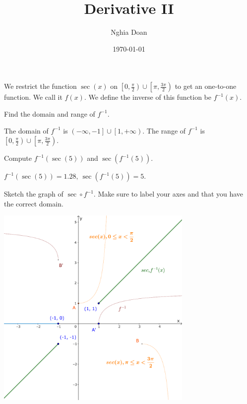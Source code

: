 \documentclass{article}
\title{Derivative II}
\author{Nghia Doan}
\date{\today}
\begin{document}
\maketitle

\begin{problem*}[1a]
    We restrict the function $\sec(x)$ on $\left[ 0, \frac{\pi}{2} \right) \cup \left[ \pi, \frac{3\pi}{2} \right)$ to get an one-to-one function.
    We call it $f(x).$ We define the inverse of this function be $f^{-1}(x).$

    Find the domain and range of $f^{-1}.$
\end{problem*}

\begin{soln}
    The domain of $f^{-1}$ is $\left( -\infty, -1 \right] \cup \left[ 1, +\infty \right).$
    The range of $f^{-1}$ is $\left[ 0, \frac{\pi}{2} \right) \cup \left[ \pi, \frac{3\pi}{2} \right).$
\end{soln}

\begin{problem*}[1b]
    Compute $f^{-1}(\sec(5))$ and $\sec(f^{-1}(5)).$
\end{problem*}

\begin{soln}
    $f^{-1}(\sec(5)) = 1.28,\ \sec(f^{-1}(5)) = 5.$
\end{soln}

\begin{problem*}[1c]
    Sketch the graph of $\sec \circ f^{-1}.$ Make sure to label your axes and that you have the correct domain.
\end{problem*}

\begin{center}
    \includegraphics[width=9.5cm]{./svg/pdf/derivative-2-1c-f.pdf}
\end{center}
\end{document}
